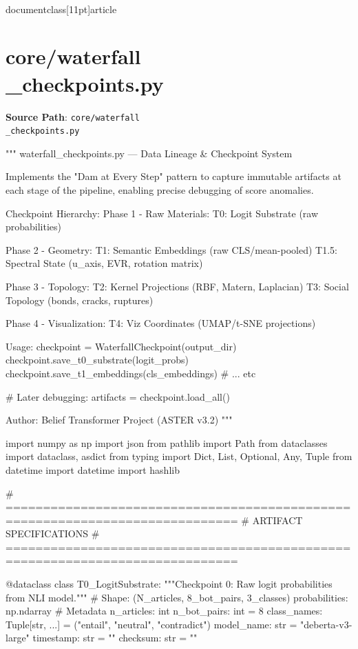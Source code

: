 \\documentclass[11pt]{article}
\begin{document}
\section*{core/waterfall\\_checkpoints.py}
\textbf{Source Path}: \texttt{core/waterfall\\_checkpoints.py}\par
\bigskip
\begin{CodeBlock}
"""
waterfall_checkpoints.py — Data Lineage & Checkpoint System

Implements the "Dam at Every Step" pattern to capture immutable artifacts
at each stage of the pipeline, enabling precise debugging of score anomalies.

Checkpoint Hierarchy:
    Phase 1 - Raw Materials:
        T0: Logit Substrate (raw probabilities)

    Phase 2 - Geometry:
        T1: Semantic Embeddings (raw CLS/mean-pooled)
        T1.5: Spectral State (u_axis, EVR, rotation matrix)

    Phase 3 - Topology:
        T2: Kernel Projections (RBF, Matern, Laplacian)
        T3: Social Topology (bonds, cracks, ruptures)

    Phase 4 - Visualization:
        T4: Viz Coordinates (UMAP/t-SNE projections)

Usage:
    checkpoint = WaterfallCheckpoint(output_dir)
    checkpoint.save_t0_substrate(logit_probs)
    checkpoint.save_t1_embeddings(cls_embeddings)
    # ... etc

    # Later debugging:
    artifacts = checkpoint.load_all()

Author: Belief Transformer Project (ASTER v3.2)
"""

import numpy as np
import json
from pathlib import Path
from dataclasses import dataclass, asdict
from typing import Dict, List, Optional, Any, Tuple
from datetime import datetime
import hashlib


# =============================================================================
# ARTIFACT SPECIFICATIONS
# =============================================================================

@dataclass
class T0_LogitSubstrate:
    """Checkpoint 0: Raw logit probabilities from NLI model."""
    # Shape: (N_articles, 8_bot_pairs, 3_classes)
    probabilities: np.ndarray
    # Metadata
    n_articles: int
    n_bot_pairs: int = 8
    class_names: Tuple[str, ...] = ("entail", "neutral", "contradict")
    model_name: str = "deberta-v3-large"
    timestamp: str = ""
    checksum: str = ""


\end{CodeBlock}
\end{document}
